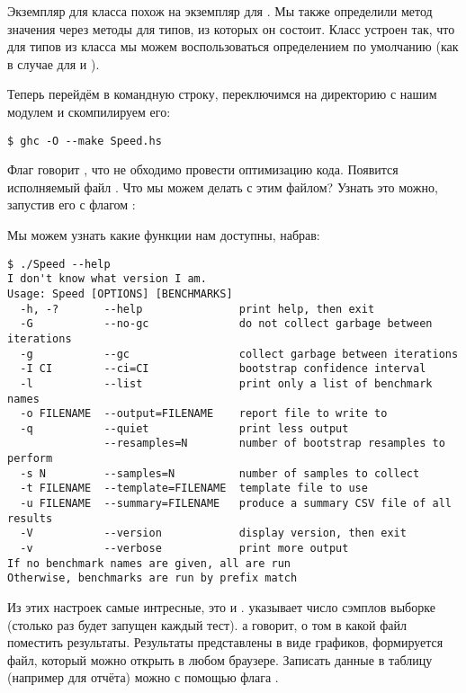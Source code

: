 Экземпляр для класса  похож на экземпляр для .
Мы также определили метод значения через методы для типов, из которых он
состоит. Класс  устроен так, что для типов из класса
 мы можем воспользоваться определением по умолчанию (как в
случае для  и ).

Теперь перейдём в командную строку, переключимся на директорию с нашим
модулем и скомпилируем его:


\begin{verbatim}
$ ghc -O --make Speed.hs
\end{verbatim}

Флаг  говорит , что не обходимо провести оптимизацию
кода. Появится исполняемый файл . Что мы можем делать с этим
файлом? Узнать это можно, запустив его с флагом :

Мы можем узнать какие функции нам доступны, набрав:


\begin{verbatim}
$ ./Speed --help
I don't know what version I am.
Usage: Speed [OPTIONS] [BENCHMARKS]
  -h, -?       --help               print help, then exit
  -G           --no-gc              do not collect garbage between iterations
  -g           --gc                 collect garbage between iterations
  -I CI        --ci=CI              bootstrap confidence interval
  -l           --list               print only a list of benchmark names
  -o FILENAME  --output=FILENAME    report file to write to
  -q           --quiet              print less output
               --resamples=N        number of bootstrap resamples to perform
  -s N         --samples=N          number of samples to collect
  -t FILENAME  --template=FILENAME  template file to use
  -u FILENAME  --summary=FILENAME   produce a summary CSV file of all results
  -V           --version            display version, then exit
  -v           --verbose            print more output
If no benchmark names are given, all are run
Otherwise, benchmarks are run by prefix match
\end{verbatim}

Из этих настроек самые интресные, это  и . 
указывает число сэмплов выборке (столько раз будет запущен каждый тест).
а  говорит, о том в какой файл поместить результаты. Результаты
представлены в виде графиков, формируется файл, который можно открыть в
любом браузере. Записать данные в таблицу (например для отчёта) можно с
помощью флага .

